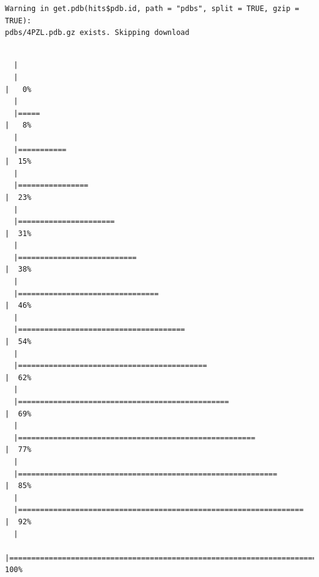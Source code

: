 \documentclass[
  letterpaper,
  DIV=11,
  numbers=noendperiod]{scrartcl}
\begin{document}
\begin{verbatim}
Warning in get.pdb(hits$pdb.id, path = "pdbs", split = TRUE, gzip = TRUE):
pdbs/4PZL.pdb.gz exists. Skipping download
\end{verbatim}

\begin{verbatim}

  |                                                                            
  |                                                                      |   0%
  |                                                                            
  |=====                                                                 |   8%
  |                                                                            
  |===========                                                           |  15%
  |                                                                            
  |================                                                      |  23%
  |                                                                            
  |======================                                                |  31%
  |                                                                            
  |===========================                                           |  38%
  |                                                                            
  |================================                                      |  46%
  |                                                                            
  |======================================                                |  54%
  |                                                                            
  |===========================================                           |  62%
  |                                                                            
  |================================================                      |  69%
  |                                                                            
  |======================================================                |  77%
  |                                                                            
  |===========================================================           |  85%
  |                                                                            
  |=================================================================     |  92%
  |                                                                            
  |======================================================================| 100%
\end{verbatim}
\end{document}
